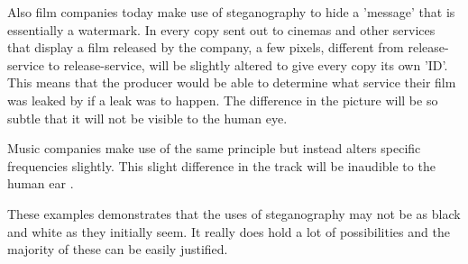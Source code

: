Also film companies today make use of steganography to hide a 'message' that is essentially a watermark.
In every copy sent out to cinemas and other services that display a film released by the company, a few pixels, different from release-service to release-service, will be slightly altered to give every copy its own 'ID'.
This means that the producer would be able to determine what service their film was leaked by if a leak was to happen.
The difference in the picture will be so subtle that it will not be visible to the human eye.

Music companies make use of the same principle but instead alters specific frequencies slightly.
This slight difference in the track will be inaudible to the human ear \citep{Anderson1998}.

These examples demonstrates that the uses of steganography may not be as black and white as they initially seem.
It really does hold a lot of possibilities and the majority of these can be easily justified.